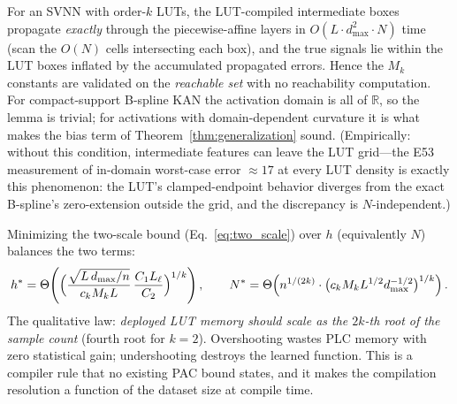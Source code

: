 \vspace{4pt}
\begin{lemma}
\label{lem:box_continuation}
For an SVNN with order-$k$ LUTs, the LUT-compiled intermediate boxes
propagate \emph{exactly} through the piecewise-affine layers in
$O(L \cdot d_{\max}^2 \cdot N)$ time (scan the $O(N)$ cells intersecting
each box), and the true signals lie within the LUT boxes inflated by the
accumulated propagated errors. Hence the $M_k$ constants are validated on
the \emph{reachable set} with no reachability computation. For
compact-support B-spline KAN the activation domain is all of
$\mathbb{R}$, so the lemma is trivial; for activations with
domain-dependent curvature it is what makes the bias term of
Theorem~\ref{thm:generalization} sound. (Empirically: without this
condition, intermediate features can leave the LUT grid---the
E53 measurement of in-domain worst-case error $\approx 17$ at every
LUT density is exactly this phenomenon: the LUT's clamped-endpoint
behavior diverges from the exact B-spline's zero-extension outside the
grid, and the discrepancy is $N$-independent.)
\end{lemma}

\vspace{4pt}
\begin{corollary}
\label{cor:resolution_matching}
Minimizing the two-scale bound (Eq.~\ref{eq:two_scale}) over $h$
(equivalently $N$) balances the two terms:
\begin{equation}
h^{*} = \Theta\!\left( \Bigl(
\frac{\sqrt{L\, d_{\max}/n}}{c_k M_k L}\,
\frac{C_1 L_\ell}{C_2}
\Bigr)^{1/k} \right),
\qquad
N^{*} = \Theta\!\left( n^{1/(2k)} \cdot \bigl(c_k M_k L^{1/2} d_{\max}^{-1/2}\bigr)^{1/k} \right).
\label{eq:resolution_matching}
\end{equation}
The qualitative law: \emph{deployed LUT memory should scale as the $2k$-th
root of the sample count} (fourth root for $k=2$). Overshooting wastes PLC
memory with zero statistical gain; undershooting destroys the learned
function. This is a compiler rule that no existing PAC bound states, and
it makes the compilation resolution a function of the dataset size at
compile time.
\end{corollary}

